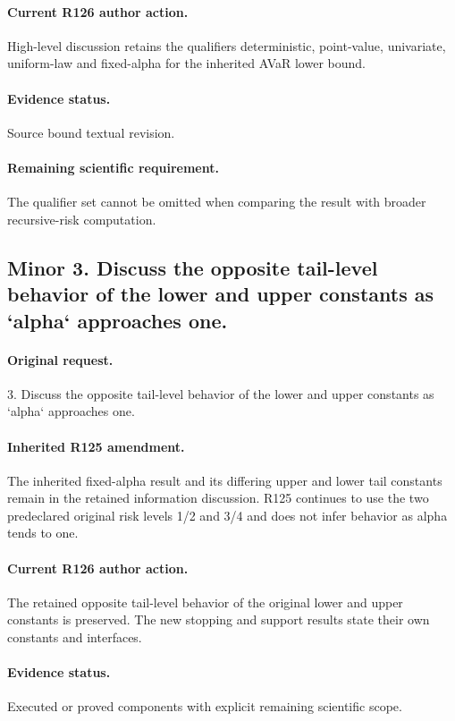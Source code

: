 \paragraph{Current R126 author action.} High-level discussion retains the qualifiers deterministic, point-value, univariate, uniform-law and fixed-alpha for the inherited AVaR lower bound.

\paragraph{Evidence status.} Source bound textual revision.


\paragraph{Remaining scientific requirement.} The qualifier set cannot be omitted when comparing the result with broader recursive-risk computation.

\subsection*{Minor 3. Discuss the opposite tail-level behavior of the lower and upper constants as `alpha` approaches one.}
\paragraph{Original request.} 3. Discuss the opposite tail-level behavior of the lower and upper constants as `alpha` approaches one.

\paragraph{Inherited R125 amendment.} The inherited fixed-alpha result and its differing upper and lower tail constants remain in the retained information discussion. R125 continues to use the two predeclared original risk levels 1/2 and 3/4 and does not infer behavior as alpha tends to one.

\paragraph{Current R126 author action.} The retained opposite tail-level behavior of the original lower and upper constants is preserved. The new stopping and support results state their own constants and interfaces.

\paragraph{Evidence status.} Executed or proved components with explicit remaining scientific scope.

